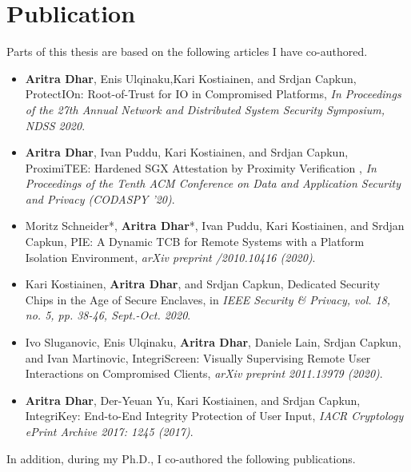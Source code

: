 \section{Publication}

Parts of this thesis are based on the following articles I have co-authored.

\begin{itemize}
  
  \item \textbf{Aritra Dhar}, Enis Ulqinaku,Kari Kostiainen, and Srdjan Capkun, ProtectIOn: Root-of-Trust for IO in Compromised Platforms, \emph{In Proceedings of the 27th Annual Network and Distributed System Security Symposium, NDSS 2020}. 
  
  \item \textbf{Aritra Dhar}, Ivan Puddu, Kari Kostiainen, and Srdjan Capkun, ProximiTEE: Hardened SGX Attestation by Proximity Verification , \emph{In Proceedings of the Tenth ACM Conference on Data and Application Security and Privacy (CODASPY '20)}.
  
  \item Moritz Schneider*, \textbf{Aritra Dhar}*, Ivan Puddu, Kari Kostiainen, and Srdjan Capkun, PIE: A Dynamic TCB for Remote Systems with a Platform Isolation Environment, \emph{arXiv preprint /2010.10416 (2020)}.
  
  \item Kari Kostiainen, \textbf{Aritra Dhar}, and Srdjan Capkun, Dedicated Security Chips in the Age of Secure Enclaves, in \emph{IEEE Security \& Privacy, vol. 18, no. 5, pp. 38-46, Sept.-Oct. 2020}.
  
  \item Ivo Sluganovic, Enis Ulqinaku, \textbf{Aritra Dhar}, Daniele Lain, Srdjan Capkun, and Ivan Martinovic, IntegriScreen: Visually Supervising Remote User Interactions on Compromised Clients, \emph{arXiv preprint 2011.13979 (2020)}.
   
  \item \textbf{Aritra Dhar}, Der-Yeuan Yu, Kari Kostiainen, and Srdjan Capkun, IntegriKey: End-to-End Integrity Protection of User Input, \emph{IACR Cryptology ePrint Archive 2017: 1245 (2017)}.
 
\end{itemize}

 In addition, during my Ph.D., I co-authored the following publications.
 
